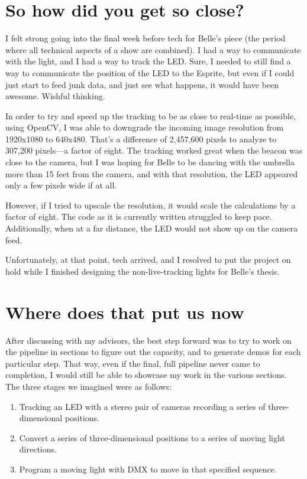 \documentclass[
    12pt,
    twoside,
    bibstyle=chicago,
    headerstyle=uppercase,
	bibfile=biblatex_updating.bib
]{reedthesis}
\begin{document}
\section{So how did you get so close?}

I felt strong going into the final week before tech for Belle's piece (the period where all technical aspects of a show are combined). I had a way to communicate with the light, and I had a way to track the LED. Sure, I needed to still find a way to communicate the position of the LED to the Esprite, but even if I could just start to feed junk data, and just see what happens, it would have been awesome. Wishful thinking.

In order to try and speed up the tracking to be as close to real-time as possible, using OpenCV, I was able to downgrade the incoming image resolution from 1920x1080 to 640x480. That's a difference of 2,457,600 pixels to analyze to 307,200 pixels---a factor of eight. The tracking worked great when the beacon was close to the camera, but I was hoping for Belle to be dancing with the umbrella more than 15 feet from the camera, and with that resolution, the LED appeared only a few pixels wide if at all.

However, if I tried to upscale the resolution, it would scale the calculations by a factor of eight. The code as it is currently written struggled to keep pace. Additionally, when at a far distance, the LED would not show up on the camera feed.

Unfortunately, at that point, tech arrived, and I resolved to put the project on hold while I finished designing the non-live-tracking lights for Belle's thesis.

\section{Where does that put us now}

After discussing with my advisors, the best step forward was to try to work on the pipeline in sections to figure out the capacity, and to generate demos for each particular step. That way, even if the final, full pipeline never came to completion, I would still be able to showcase my work in the various sections. The three stages we imagined were as follows:
\begin{enumerate}
	\item Tracking an LED with a stereo pair of cameras recording a series of three-dimensional positions.
	\item Convert a series of three-dimensional positions to a series of moving light directions.
	\item Program a moving light with DMX to move in that specified sequence.
\end{enumerate}
\end{document}
